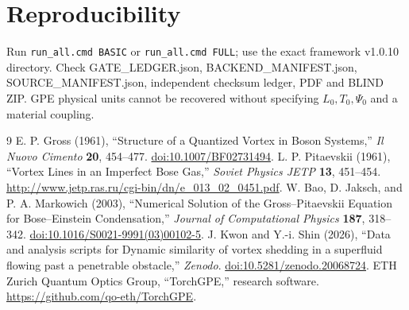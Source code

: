 \documentclass[11pt,a4paper]{article}
\begin{document}
\section{Reproducibility}
Run \texttt{run\_all.cmd BASIC} or \texttt{run\_all.cmd FULL}; use the exact framework v1.0.10 directory. Check GATE\_LEDGER.json, BACKEND\_MANIFEST.json, SOURCE\_MANIFEST.json, independent checksum ledger, PDF and BLIND ZIP. GPE physical units cannot be recovered without specifying $L_0,T_0,\Psi_0$ and a material coupling.
\begin{thebibliography}{9}
 E. P. Gross (1961), ``Structure of a Quantized Vortex in Boson Systems,'' \emph{Il Nuovo Cimento} \textbf{20}, 454--477. \href{https://doi.org/10.1007/BF02731494}{doi:10.1007/BF02731494}.
 L. P. Pitaevskii (1961), ``Vortex Lines in an Imperfect Bose Gas,'' \emph{Soviet Physics JETP} \textbf{13}, 451--454. \url{http://www.jetp.ras.ru/cgi-bin/dn/e_013_02_0451.pdf}.
 W. Bao, D. Jaksch, and P. A. Markowich (2003), ``Numerical Solution of the Gross--Pitaevskii Equation for Bose--Einstein Condensation,'' \emph{Journal of Computational Physics} \textbf{187}, 318--342. \href{https://doi.org/10.1016/S0021-9991(03)00102-5}{doi:10.1016/S0021-9991(03)00102-5}.
 J. Kwon and Y.-i. Shin (2026), ``Data and analysis scripts for Dynamic similarity of vortex shedding in a superfluid flowing past a penetrable obstacle,'' \emph{Zenodo}. \href{https://doi.org/10.5281/zenodo.20068724}{doi:10.5281/zenodo.20068724}.
 ETH Zurich Quantum Optics Group, ``TorchGPE,'' research software. \url{https://github.com/qo-eth/TorchGPE}.
\end{thebibliography}
\end{document}
